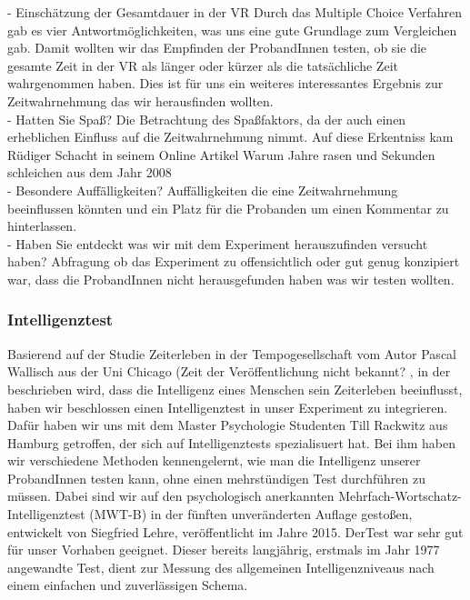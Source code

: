 \documentclass{Bericht}
\begin{document}
- Einschätzung der Gesamtdauer in der VR
Durch das Multiple Choice Verfahren gab es vier Antwortmöglichkeiten, was uns eine gute Grundlage zum Vergleichen gab. Damit wollten wir das Empfinden der ProbandInnen testen, ob sie die gesamte Zeit in der VR als länger oder kürzer als die tatsächliche Zeit wahrgenommen haben. Dies ist für uns ein weiteres interessantes Ergebnis zur Zeitwahrnehmung das wir herausfinden wollten. \\

- Hatten Sie Spaß?
Die Betrachtung des Spaßfaktors,  da der auch einen erheblichen Einfluss auf die Zeitwahrnehmung nimmt. Auf diese Erkentniss kam \glqq Rüdiger Schacht\glqq{} in seinem Online Artikel \glqq Warum Jahre rasen und Sekunden schleichen \glqq{}  aus dem Jahr 2008 \cite{Spass} \\

- Besondere Auffälligkeiten?
Auffälligkeiten die eine Zeitwahrnehmung beeinflussen könnten und ein Platz für die Probanden um einen Kommentar zu hinterlassen. \\

- Haben Sie entdeckt was wir mit dem Experiment herauszufinden versucht haben?
Abfragung ob das Experiment zu offensichtlich oder gut genug konzipiert war, dass die ProbandInnen nicht herausgefunden haben was wir testen wollten. 

\subsubsection{Intelligenztest}

Basierend auf der Studie \glqq Zeiterleben in der Tempogesellschaft\glqq{} vom Autor Pascal Wallisch aus der Uni Chicago (Zeit der Veröffentlichung nicht bekannt? \cite{Tempo}, in der beschrieben wird, dass die Intelligenz eines Menschen sein Zeiterleben beeinflusst, haben wir beschlossen einen Intelligenztest in unser Experiment zu integrieren. Dafür haben wir uns mit dem Master Psychologie Studenten Till Rackwitz aus Hamburg getroffen, der sich auf Intelligenztests spezialisuert hat. Bei ihm haben wir verschiedene Methoden kennengelernt, wie man die Intelligenz unserer ProbandInnen testen kann, ohne einen mehrstündigen Test durchführen zu müssen. Dabei sind wir auf den psychologisch anerkannten \glqq Mehrfach-Wortschatz-Intelligenztest (MWT-B)\glqq{} in der fünften unveränderten Auflage gestoßen, entwickelt von Siegfried Lehre, veröffentlicht im Jahre 2015. DerTest war sehr gut für unser Vorhaben geeignet. Dieser bereits langjährig, erstmals im Jahr 1977 angewandte Test, dient zur Messung des allgemeinen Intelligenzniveaus nach einem einfachen und zuverlässigen Schema.
\end{document}
